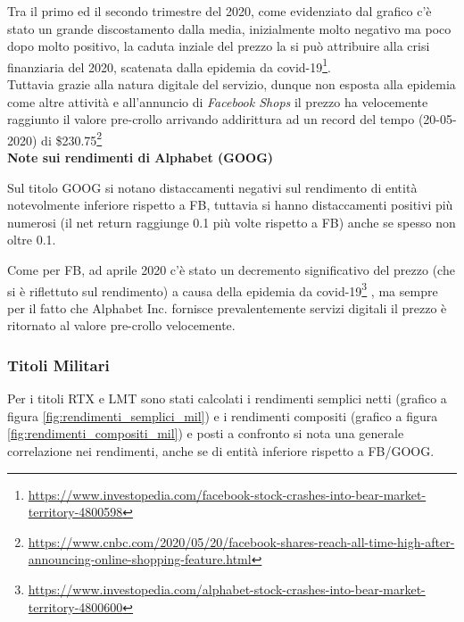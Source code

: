 Tra il primo ed il secondo trimestre del 2020, come evidenziato dal grafico c'è stato un grande discostamento dalla media, inizialmente molto negativo ma poco dopo molto positivo,
la caduta inziale del prezzo la si può attribuire alla crisi finanziaria del 2020, scatenata dalla epidemia da 
covid-19\footnote{
  \href{https://www.investopedia.com/facebook-stock-crashes-into-bear-market-territory-4800598}{https://www.investopedia.com/facebook-stock-crashes-into-bear-market-territory-4800598}
}.\\
Tuttavia grazie alla natura digitale del servizio, dunque non esposta alla epidemia come altre attività e all'annuncio di \emph{Facebook Shops} il prezzo ha velocemente raggiunto il valore pre-crollo arrivando
addirittura ad un record del tempo (20-05-2020) di 
\$230.75\footnote{
  \href{https://www.cnbc.com/2020/05/20/facebook-shares-reach-all-time-high-after-announcing-online-shopping-feature.html}{https://www.cnbc.com/2020/05/20/facebook-shares-reach-all-time-high-after-announcing-online-shopping-feature.html}
}\\

\textbf{Note sui rendimenti di Alphabet (GOOG)}

Sul titolo GOOG si notano distaccamenti negativi sul rendimento di entità notevolmente inferiore rispetto a FB, tuttavia si hanno distaccamenti positivi più numerosi (il net return raggiunge 0.1 più volte rispetto a FB) anche se spesso non oltre 0.1.

Come per FB, ad aprile 2020 c'è stato un decremento significativo del prezzo (che si è riflettuto sul rendimento) a causa della epidemia da 
covid-19\footnote{
  \href{https://www.investopedia.com/alphabet-stock-crashes-into-bear-market-territory-4800600}{https://www.investopedia.com/alphabet-stock-crashes-into-bear-market-territory-4800600}
}
, ma sempre per il fatto che Alphabet Inc. fornisce
prevalentemente servizi digitali il prezzo è ritornato al valore pre-crollo velocemente.

\subsubsection{Titoli Militari}

Per i titoli RTX e LMT sono stati calcolati i rendimenti semplici netti (grafico a figura \ref{fig:rendimenti_semplici_mil}) e i rendimenti compositi (grafico a figura \ref{fig:rendimenti_compositi_mil}) e posti a confronto
si nota una generale correlazione nei rendimenti, anche se di entità inferiore rispetto a FB/GOOG.


